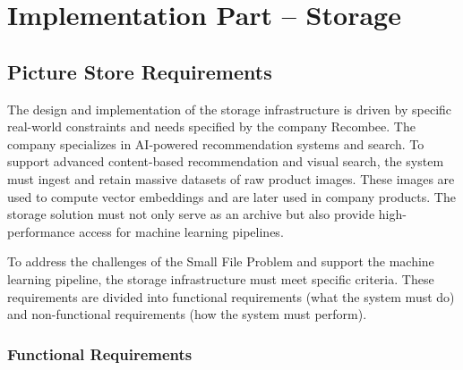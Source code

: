 \chapter{Implementation Part -- Storage}
\label{ch:impl_storage}

\section{Picture Store Requirements}\label{sec:picture_store_requirements}
The design and implementation of the storage infrastructure is driven by specific real-world constraints and needs specified by the company Recombee. The company specializes in AI-powered recommendation systems and search. To support advanced content-based recommendation and visual search, the system must ingest and retain massive datasets of raw product images. These images are used to compute vector embeddings and are later used in company products. The storage solution must not only serve as an archive but also provide high-performance access for machine learning pipelines.

To address the challenges of the Small File Problem and support the machine learning pipeline, the storage infrastructure must meet specific criteria. These requirements are divided into functional requirements (what the system must do) and non-functional requirements (how the system must perform).

\subsection{Functional Requirements}\label{sec:functional_requirements_storage}

